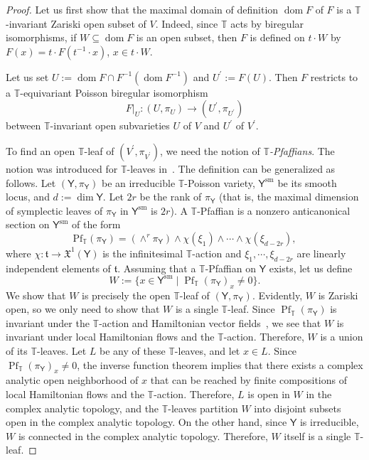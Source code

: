 \documentclass[11pt]{article}
\DeclareMathOperator{\dom}{dom}
\DeclareMathOperator{\Pf}{Pf}
\DeclareMathOperator{\sm}{sm}
\theoremstyle{definition}\newtheorem{definition}[theorem]{Definition}
\theoremstyle{definition}\newtheorem{remark}[theorem]{Remark}
\theoremstyle{remark}
\numberwithin{equation}{section}
\begin{document}
\begin{proof}
    Let us first show that the maximal domain of definition $\dom F$ of $F$ is a $\mathbb{T}$-invariant Zariski open subset of $V$. Indeed, since $\mathbb{T}$ acts by biregular isomorphisms, if $W \subseteq \dom F$ is an open subset, then $F$ is defined on $t\cdot W$ by $F(x) = t\cdot F(t^{-1}\cdot x)$, $x \in t\cdot W$. 
    
    Let us set $U:=\dom F \cap F^{-1}(\dom F^{-1})$ and $U^\prime := F(U)$. Then $F$ restricts to a $\mathbb{T}$-equivariant Poisson biregular isomorphism 
    \begin{equation*}
        F|_U:(U,\pi_U) \rightarrow (U^\prime,\pi_{U^\prime})
    \end{equation*}
    between $\mathbb{T}$-invariant open subvarieties $U$ of $V$ and $U^\prime$ of $V^\prime$.
    
    To find an open $\mathbb{T}$-leaf of $(V^\prime,\pi_{V^\prime})$, we need the notion of \emph{$\mathbb{T}$-Pfaffians}. The notion was introduced for $\mathbb{T}$-leaves in~\cite{lm-leaf}. The definition can be generalized as follows. Let $(\mathsf{Y}, \pi_{\mathsf{Y}})$ be an irreducible $\mathbb{T}$-Poisson variety, $\mathsf{Y}^{\sm}$ be its smooth locus, and  $d:=\dim \mathsf{Y}$. Let $2r$ be the rank of $\pi_{\mathsf{Y}}$ (that is, the maximal dimension of symplectic leaves of $\pi_\mathsf{Y}$ in $\mathsf{Y}^{\sm}$ is $2r$). A $\mathbb{T}$-Pfaffian is a nonzero anticanonical section on $\mathsf{Y}^{\sm}$ of the form
    \[
        \mathrm{Pf}_\mathbb{T}(\pi_{\mathsf{Y}})=(\wedge^{r} \pi_{\mathsf{Y}}) \wedge \chi({\xi_1}) \wedge \cdots \wedge \chi(\xi_{d-2r}),
    \]
    where $\chi : \mathfrak{t} \rightarrow \mathfrak{X}^1(\mathsf{Y})$ is the infinitesimal $\mathbb{T}$-action and $\xi_1,\cdots, \xi_{d-2r}$ are linearly independent elements of $\mathfrak{t}$. Assuming that a $\mathbb{T}$-Pfaffian on $\mathsf{Y}$ exists, let us define
    \begin{equation*}
        W:=\{x \in \mathsf{Y}^{\sm} \mid \Pf_{\mathbb{T}}(\pi_{\mathsf{Y}})_x \neq 0\}.
    \end{equation*}
    We show that $W$ is precisely the open $\mathbb{T}$-leaf of $(\mathsf{Y}, \pi_\mathsf{Y})$. Evidently, $W$ is Zariski open, so we only need to show that $W$ is a single $\mathbb{T}$-leaf. Since $\Pf_{\mathbb{T}}(\pi_{\mathsf{Y}})$ is invariant under the $\mathbb{T}$-action and Hamiltonian vector fields~\cite[Proposition 3.15]{py-fs}, we see that $W$ is invariant under local Hamiltonian flows and the $\mathbb{T}$-action. Therefore, $W$ is a union of its $\mathbb{T}$-leaves.
    Let $L$ be any of these $\mathbb{T}$-leaves, and let $x \in L$. Since $\Pf_{\mathbb{T}}(\pi_{\mathsf{Y}})_x\neq 0$, the inverse function theorem implies that there
    exists a complex analytic open neighborhood of $x$ that can be reached by finite compositions of local Hamiltonian flows and the $\mathbb{T}$-action. Therefore, $L$ is open in $W$ in the complex analytic topology, and the $\mathbb{T}$-leaves partition $W$ into disjoint subsets open in the complex analytic topology. On the other hand, since $\mathsf{Y}$ is irreducible, $W$ is connected in the complex analytic topology. Therefore, $W$ itself is a single $\mathbb{T}$-leaf.
    

\end{proof}
\end{document}
